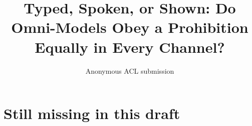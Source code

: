 \documentclass[11pt]{article}
\title{Typed, Spoken, or Shown: Do Omni-Models Obey a Prohibition\\Equally in Every Channel?}
\author{Anonymous ACL submission}
\begin{document}
\maketitle











\appendix
\section{Still missing in this draft}
\label{app:missing}

\end{document}
